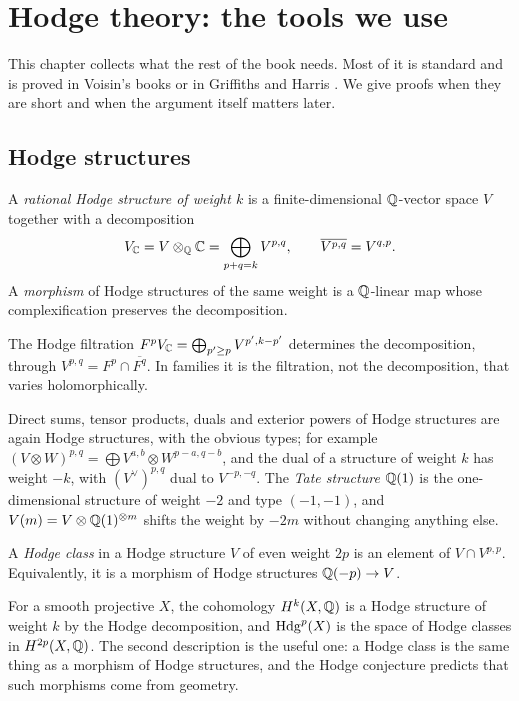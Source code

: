 \chapter{Hodge theory: the tools we use}\label{ch:toolkit}

This chapter collects what the rest of the book needs. Most of it is
standard and is proved in Voisin's books \cite{Voi02,Voi03} or in Griffiths
and Harris \cite{GH78}. We give proofs when they are short and when the
argument itself matters later.

\section{Hodge structures}

\begin{definition}
A \emph{rational Hodge structure of weight $k$} is a finite-dimensional
$\mathbb{Q}$-vector space $V$ together with a decomposition
\[
  V_{\mathbb{C}}=V\otimes_{\mathbb{Q}}\mathbb{C}=\bigoplus_{p+q=k}V^{p,q},\qquad
  \overline{V^{p,q}}=V^{q,p}.
\]
A \emph{morphism} of Hodge structures of the same weight is a
$\mathbb{Q}$-linear map whose complexification preserves the decomposition.
\end{definition}

The Hodge filtration $F^{p}V_{\mathbb{C}}=\bigoplus_{p'\ge p}V^{p',k-p'}$
determines the decomposition, through $V^{p,q}=F^{p}\cap\overline{F^{q}}$.
In families it is the filtration, not the decomposition, that varies
holomorphically.

Direct sums, tensor products, duals and exterior powers of Hodge
structures are again Hodge structures, with the obvious types; for example
$(V\otimes W)^{p,q}=\bigoplus V^{a,b}\otimes W^{p-a,q-b}$, and the dual of
a structure of weight $k$ has weight $-k$, with $(V^{\vee})^{p,q}$ dual to
$V^{-p,-q}$. The \emph{Tate structure} $\mathbb{Q}(1)$ is the one-dimensional
structure of weight $-2$ and type $(-1,-1)$, and $V(m)=V\otimes\mathbb{Q}(1)^{\otimes m}$
shifts the weight by $-2m$ without changing anything else.

\begin{definition}
A \emph{Hodge class} in a Hodge structure $V$ of even weight $2p$ is an
element of $V\cap V^{p,p}$. Equivalently, it is a morphism of Hodge
structures $\mathbb{Q}(-p)\to V$.
\end{definition}

For a smooth projective $X$, the cohomology $H^{k}(X,\mathbb{Q})$ is a Hodge
structure of weight $k$ by the Hodge decomposition, and $\operatorname{Hdg}^{p}(X)$ is
the space of Hodge classes in $H^{2p}(X,\mathbb{Q})$. The second description is
the useful one: a Hodge class is the same thing as a morphism of Hodge
structures, and the Hodge conjecture predicts that such morphisms come
from geometry.

